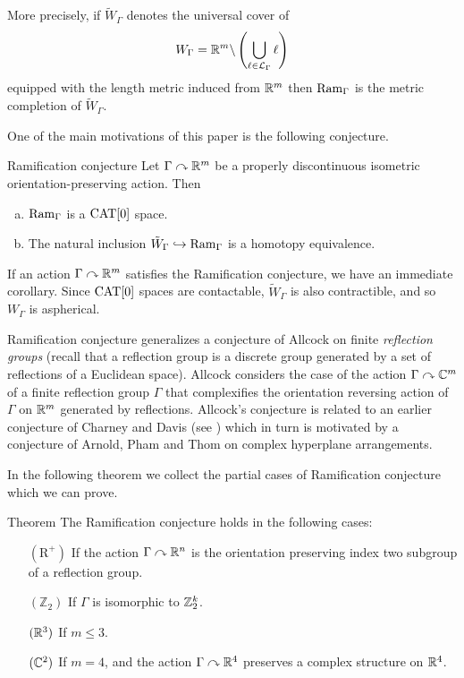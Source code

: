 \documentclass[oneside,a4paper]{article}
\def\Ram{\mathop{\rm Ram}\nolimits}
\begin{document}
More precisely, if $\tilde W_\Gamma$ denotes the universal cover of
$$W_\Gamma=\mathbb{R}^m\backslash
\left(\bigcup_{\ell\in\mathcal{L}_\Gamma}\ell\right)$$
equipped with the length metric induced from $\mathbb{R}^m$
then $\Ram_\Gamma$ is the metric completion of $\tilde W_\Gamma$.

One of the main motivations of this paper is the following conjecture.

\begin{thm}{Ramification conjecture}\label{mainconjecture}
Let $\Gamma\curvearrowright\mathbb{R}^m$ be a properly discontinuous isometric orientation-preserving action.
Then
\begin{enumerate}[a)]
\item $\Ram_\Gamma$ is a $\mathrm{CAT}[0]$ space.
\item The natural inclusion
$\tilde W_\Gamma\hookrightarrow \Ram_\Gamma$ is a homotopy equivalence.
\end{enumerate}

\end{thm}

If an action $\Gamma\curvearrowright\mathbb{R}^m$ satisfies the Ramification conjecture, we have an immediate corollary. Since $\mathrm{CAT}[0]$ spaces are contactable,
$\tilde W_\Gamma$ is also contractible,
and so $W_\Gamma$ is aspherical.

Ramification conjecture generalizes a conjecture of Allcock  \cite[Conjecture 1.4]{allcock} on finite \emph{reflection groups} (recall that a reflection group is a discrete group generated by a set of reflections of a Euclidean space). Allcock considers the case of the action $\Gamma\curvearrowright\mathbb{C}^m$ of a finite reflection group $\Gamma$ that complexifies the  orientation reversing action of $\Gamma$ on $\mathbb{R}^m$ generated by reflections. 
Allcock's conjecture is related to an earlier conjecture of Charney and Davis (see \cite[Conjecture 3]{charney-davis-95}) which in turn is motivated by a conjecture of Arnold, Pham and Thom on complex hyperplane  arrangements.

In the following theorem we collect the partial cases of Ramification conjecture which we can prove. 

\begin{thm}{Theorem}\label{thm:main}
The Ramification conjecture holds in the following cases:
\begin{itemize}
\item[$(\mathrm{R}^+)$] If the action $\Gamma\curvearrowright\mathbb{R}^n$ is the orientation preserving index two subgroup of a reflection group.
\item[$(\mathbb{Z}_2)$] If $\Gamma$ is isomorphic to $\mathbb{Z}_2^k$.
\item[$(\mathbb{R}^3)$]\label{3} If $m\le 3$.
\item[$(\mathbb{C}^2)$]\label{4}
If $m=4$, and the action $\Gamma\curvearrowright\mathbb{R}^4$
preserves a complex structure on $\mathbb{R}^4$.
\end{itemize}

\end{thm}
\end{document}
